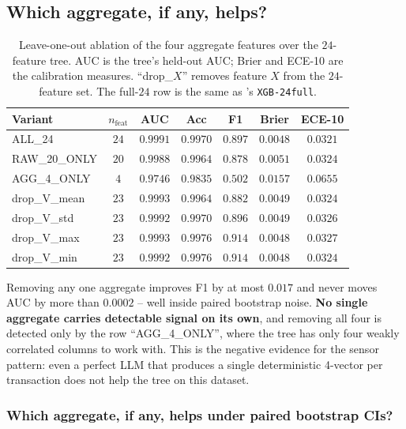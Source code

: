 \subsection{Which aggregate, if any, helps?}

\begin{table}[t]
\centering
\small
\caption{Leave-one-out ablation of the four aggregate features over
the $24$-feature tree. AUC is the tree's held-out AUC; Brier and ECE-10
are the calibration measures. ``drop\_$X$'' removes feature $X$ from
the $24$-feature set. The full-$24$ row is the same as
's \texttt{XGB-24full}.}
\label{tab:p8-evidence-abl}
\begin{tabular}{lcccccc}
\toprule
Variant & $n_{\text{feat}}$ & AUC & Acc & F1 & Brier & ECE-10 \\
\midrule
ALL\_24         & $24$ & $0.9991$ & $0.9970$ & $0.897$ & $0.0048$ & $0.0321$ \\
RAW\_20\_ONLY   & $20$ & $0.9988$ & $0.9964$ & $0.878$ & $0.0051$ & $0.0324$ \\
AGG\_4\_ONLY    & $4$  & $0.9746$ & $0.9835$ & $0.502$ & $0.0157$ & $0.0655$ \\
drop\_V\_mean   & $23$ & $0.9993$ & $0.9964$ & $0.882$ & $0.0049$ & $0.0324$ \\
drop\_V\_std    & $23$ & $0.9992$ & $0.9970$ & $0.896$ & $0.0049$ & $0.0326$ \\
drop\_V\_max    & $23$ & $0.9993$ & $0.9976$ & $0.914$ & $0.0048$ & $0.0327$ \\
drop\_V\_min    & $23$ & $0.9992$ & $0.9976$ & $0.914$ & $0.0048$ & $0.0324$ \\
\bottomrule
\end{tabular}
\end{table}

Removing any one aggregate improves F1 by at most $0.017$ and never
moves AUC by more than $0.0002$ -- well inside paired bootstrap noise.
\textbf{No single aggregate carries detectable signal on its own}, and
removing all four is detected only by the row ``AGG\_4\_ONLY'', where
the tree has only four weakly correlated columns to work with. This is
the negative evidence for the sensor pattern: even a perfect LLM that
produces a single deterministic 4-vector per transaction does not help
the tree on this dataset.

\subsubsection{Which aggregate, if any, helps under paired bootstrap CIs?}

